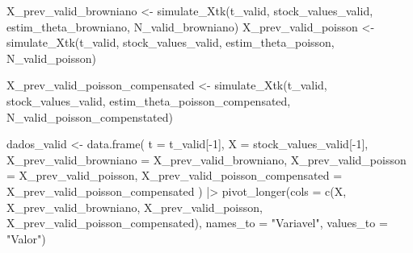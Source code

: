 \documentclass[
  letterpaper,
  DIV=11,
  numbers=noendperiod]{scrreprt}
\newenvironment{Shaded}{\begin{snugshade}}{\end{snugshade}}
\newcommand{\AttributeTok}[1]{\textcolor[rgb]{0.40,0.45,0.13}{#1}}
\newcommand{\DecValTok}[1]{\textcolor[rgb]{0.68,0.00,0.00}{#1}}
\newcommand{\FunctionTok}[1]{\textcolor[rgb]{0.28,0.35,0.67}{#1}}
\newcommand{\NormalTok}[1]{\textcolor[rgb]{0.00,0.23,0.31}{#1}}
\newcommand{\OtherTok}[1]{\textcolor[rgb]{0.00,0.23,0.31}{#1}}
\newcommand{\SpecialCharTok}[1]{\textcolor[rgb]{0.37,0.37,0.37}{#1}}
\newcommand{\StringTok}[1]{\textcolor[rgb]{0.13,0.47,0.30}{#1}}
\begin{document}
\begin{Shaded}
\begin{Highlighting}[]
\NormalTok{X\_prev\_valid\_browniano }\OtherTok{\textless{}{-}} \FunctionTok{simulate\_Xtk}\NormalTok{(t\_valid,}
\NormalTok{                                       stock\_values\_valid,}
\NormalTok{                                       estim\_theta\_browniano,}
\NormalTok{                                       N\_valid\_browniano)}
\NormalTok{X\_prev\_valid\_poisson }\OtherTok{\textless{}{-}} \FunctionTok{simulate\_Xtk}\NormalTok{(t\_valid,}
\NormalTok{                                     stock\_values\_valid,}
\NormalTok{                                     estim\_theta\_poisson,}
\NormalTok{                                     N\_valid\_poisson)}

\NormalTok{X\_prev\_valid\_poisson\_compensated }\OtherTok{\textless{}{-}} \FunctionTok{simulate\_Xtk}\NormalTok{(t\_valid,}
\NormalTok{                                                 stock\_values\_valid,}
\NormalTok{                                                 estim\_theta\_poisson\_compensated,}
\NormalTok{                                                 N\_valid\_poisson\_compenstated)                                     }

\NormalTok{dados\_valid }\OtherTok{\textless{}{-}} \FunctionTok{data.frame}\NormalTok{(}
    \AttributeTok{t =}\NormalTok{ t\_valid[}\SpecialCharTok{{-}}\DecValTok{1}\NormalTok{],}
    \AttributeTok{X =}\NormalTok{ stock\_values\_valid[}\SpecialCharTok{{-}}\DecValTok{1}\NormalTok{],}
    \AttributeTok{X\_prev\_valid\_browniano =}\NormalTok{ X\_prev\_valid\_browniano,}
    \AttributeTok{X\_prev\_valid\_poisson =}\NormalTok{ X\_prev\_valid\_poisson,}
    \AttributeTok{X\_prev\_valid\_poisson\_compensated =}\NormalTok{ X\_prev\_valid\_poisson\_compensated}
\NormalTok{) }\SpecialCharTok{|\textgreater{}} 
\FunctionTok{pivot\_longer}\NormalTok{(}\AttributeTok{cols =} \FunctionTok{c}\NormalTok{(X,}
\NormalTok{                      X\_prev\_valid\_browniano,}
\NormalTok{                      X\_prev\_valid\_poisson,}
\NormalTok{                      X\_prev\_valid\_poisson\_compensated),}
             \AttributeTok{names\_to =} \StringTok{"Variavel"}\NormalTok{,}
             \AttributeTok{values\_to =} \StringTok{"Valor"}\NormalTok{) }
\end{Highlighting}
\end{Shaded}
\end{document}
